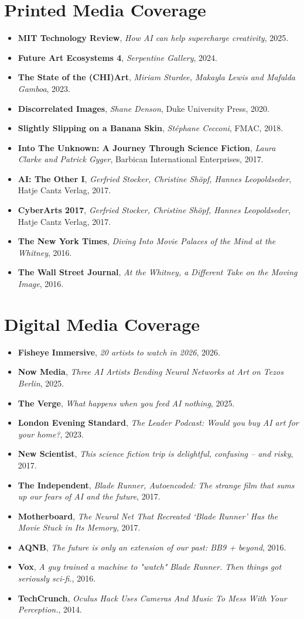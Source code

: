 \documentclass[letterpaper,11pt]{article}
\newcommand{\resumeItem}[2]{
  \item\small{
    \textbf{#1}{ #2 \vspace{-2pt}}
  }
}
\newcommand{\resumeSubItem}[2]{\resumeItem{#1}{#2}\vspace{-4pt}}
\newcommand{\resumeSubHeadingListStart}{\begin{itemize}[leftmargin=*]}
\newcommand{\resumeSubHeadingListEnd}{\end{itemize}}
\begin{document}
 \section{Printed Media Coverage}
 \resumeSubHeadingListStart
 \resumeSubItem{}{\textbf{MIT Technology Review}, \textit{How AI can help supercharge creativity}, 2025.}
 \resumeSubItem{}{\textbf{Future Art Ecosystems 4}, \textit{Serpentine Gallery}, 2024.}
 \resumeSubItem{}{\textbf{The State of the (CHI)Art}, \textit{Miriam Sturdee, Makayla Lewis and Mafalda Gamboa}, 2023.}
 \resumeSubItem{}{\textbf{Discorrelated Images}, \textit{Shane Denson}, Duke University Press, 2020.}
  \resumeSubItem{}{\textbf{Slightly Slipping on a Banana Skin}, \textit{St\'ephane Cecconi}, FMAC, 2018.}
 \resumeSubItem{}{\textbf{Into The Unknown: A Journey Through Science Fiction}, \textit{Laura Clarke and Patrick Gyger}, Barbican International Enterprises, 2017.}
 \resumeSubItem{}{\textbf{AI: The Other I}, \textit{Gerfried Stocker, Christine Sh\"{o}pf, Hannes Leopoldseder}, Hatje Cantz Verlag, 2017.}
 \resumeSubItem{}{\textbf{CyberArts 2017}, \textit{Gerfried Stocker, Christine Sh\"{o}pf, Hannes Leopoldseder}, Hatje Cantz Verlag, 2017.}
 \resumeSubItem{}{\textbf{The New York Times}, \textit{Diving Into Movie Palaces of the Mind at the Whitney}, 2016.}
 \resumeSubItem{}{\textbf{The Wall Street Journal}, \textit{At the Whitney, a Different Take on the Moving Image}, 2016.}
 \resumeSubHeadingListEnd


 \section{Digital Media Coverage}
 \resumeSubHeadingListStart
   \resumeSubItem{}{\textbf{Fisheye Immersive}, \textit{20 artists to watch in 2026}, 2026.}
  \resumeSubItem{}{\textbf{Now Media}, \textit{Three AI Artists Bending Neural Networks at Art on Tezos Berlin}, 2025.}
  \resumeSubItem{}{\textbf{The Verge}, \textit{What happens when you feed AI nothing}, 2025.}
  \resumeSubItem{}{\textbf{London Evening Standard}, \textit{The Leader Podcast: Would you buy AI art for your home?}, 2023.}
 \resumeSubItem{}{\textbf{New Scientist}, \textit{This science fiction trip is delightful, confusing – and risky}, 2017.}
 \resumeSubItem{}{\textbf{The Independent}, \textit{Blade Runner, Autoencoded: The strange film that sums up our fears of AI and the future}, 2017.}
  \resumeSubItem{}{\textbf{Motherboard}, \textit{The Neural Net That Recreated ‘Blade Runner’ Has the Movie Stuck in Its Memory}, 2017.}
 \resumeSubItem{}{\textbf{AQNB}, \textit{The future is only an extension of our past: BB9 + beyond}, 2016.}
 \resumeSubItem{}{\textbf{Vox}, \textit{A guy trained a machine to "watch" Blade Runner. Then things got seriously sci-fi.}, 2016.}
 \resumeSubItem{}{\textbf{TechCrunch}, \textit{Oculus Hack Uses Cameras And Music To Mess With Your Perception.}, 2014.}
 \resumeSubHeadingListEnd
\end{document}
